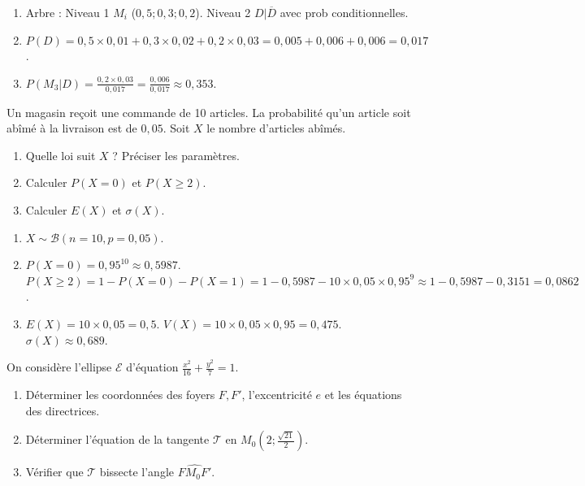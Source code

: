 \documentclass[11pt]{article}
\begin{document}
\begin{corrige}[Exercice 1]
\begin{enumerate}
    \item Arbre : Niveau 1 $M_i$ ($0,5; 0,3; 0,2$). Niveau 2 $D|\overline{D}$ avec prob conditionnelles.
    \item $P(D) = 0,5\times0,01 + 0,3\times0,02 + 0,2\times0,03 = 0,005+0,006+0,006 = 0,017$.
    \item $P(M_3|D) = \frac{0,2\times0,03}{0,017} = \frac{0,006}{0,017} \approx 0,353$.
\end{enumerate}
\end{corrige}

\begin{exercice}
Un magasin reçoit une commande de 10 articles. La probabilité qu'un article soit abîmé à la livraison est de $0,05$. Soit $X$ le nombre d'articles abîmés.
\begin{enumerate}
    \item Quelle loi suit $X$ ? Préciser les paramètres.
    \item Calculer $P(X=0)$ et $P(X \ge 2)$.
    \item Calculer $E(X)$ et $\sigma(X)$.
\end{enumerate}
\end{exercice}

\begin{corrige}[Exercice 2]
\begin{enumerate}
    \item $X \sim \mathcal{B}(n=10, p=0,05)$.
    \item $P(X=0) = 0,95^{10} \approx 0,5987$. $P(X \ge 2) = 1 - P(X=0) - P(X=1) = 1 - 0,5987 - 10\times0,05\times0,95^9 \approx 1 - 0,5987 - 0,3151 = 0,0862$.
    \item $E(X) = 10\times0,05 = 0,5$. $V(X) = 10\times0,05\times0,95 = 0,475$. $\sigma(X) \approx 0,689$.
\end{enumerate}
\end{corrige}

\begin{exercice}
On considère l'ellipse $\mathcal{E}$ d'équation $\frac{x^2}{16} + \frac{y^2}{7} = 1$.
\begin{enumerate}
    \item Déterminer les coordonnées des foyers $F, F'$, l'excentricité $e$ et les équations des directrices.
    \item Déterminer l'équation de la tangente $\mathcal{T}$ en $M_0(2; \frac{\sqrt{21}}{2})$.
    \item Vérifier que $\mathcal{T}$ bissecte l'angle $\widehat{F M_0 F'}$.
\end{enumerate}
\end{exercice}
\end{document}
